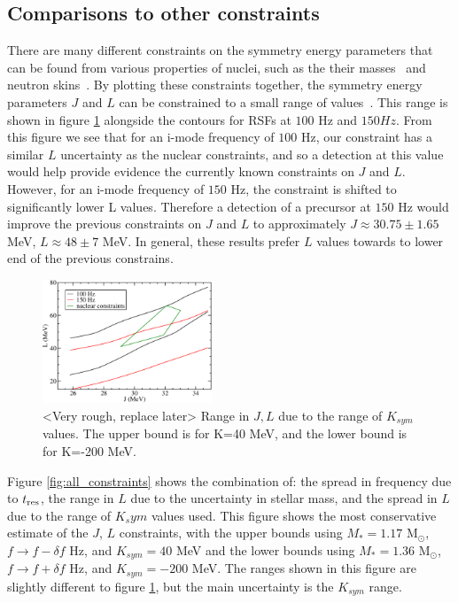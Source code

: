 \documentclass[fleqn,usenatbib]{mnras}
\begin{document}
\subsection{Comparisons to other constraints}
\hspace{\parindent}There are many different constraints on the symmetry energy parameters that can be found from various properties of nuclei, such as the their masses~\citet{kortelainen2010nuclear} and neutron skins~\citet{chen2010density}. By plotting these constraints together, the symmetry energy parameters $J$ and $L$ can be constrained to a small range of values~\citet{balantekin2014nuclear}. This range is shown in figure \ref{fig:constraints} alongside the contours for RSFs at $100$ Hz and $150 Hz$.
From this figure we see that for an i-mode frequency of $100$ Hz, our constraint has a similar $L$ uncertainty as the nuclear constraints, and so a detection at this value would help provide evidence the currently known constraints on $J$ and $L$. However, for an i-mode frequency of $150$ Hz, the constraint is shifted to significantly lower L values. Therefore a detection of a precursor at $150$ Hz would improve the previous constraints on $J$ and $L$ to approximately $J\approx 30.75\pm 1.65$ MeV, $L\approx 48\pm 7$ MeV. In general, these results prefer $L$ values towards to lower end of the previous constrains. %

\begin{figure}
\centering
\includegraphics[width=0.45\textwidth,angle=0]{constraints_rough_2}
\caption{<Very rough, replace later> Range in $J,L$ due to the range of $K_{sym}$ values. The upper bound is for K=40 MeV, and the lower bound is for K=-200 MeV.}
\label{fig:constraints}
\end{figure}

\hspace{\parindent}Figure \ref{fig:all_constraints} shows the combination of: the spread in frequency due to $t_{\rm res}$, the range in $L$ due to the uncertainty in stellar mass, and the spread in $L$ due to the range of $K_sym$ values used. This figure shows the most conservative estimate of the $J$, $L$ constraints, with the upper bounds using $M_*=1.17$ M$_{\odot}$, $f\rightarrow f-\delta f$ Hz, and $K_{sym}=40$ MeV and the lower bounds using $M_*=1.36$ M$_{\odot}$, $f\rightarrow f+\delta f$ Hz, and $K_{sym}=-200$ MeV. The ranges shown in this figure are slightly different to figure \ref{fig:constraints}, but the main uncertainty is the $K_{sym}$ range.
\end{document}
